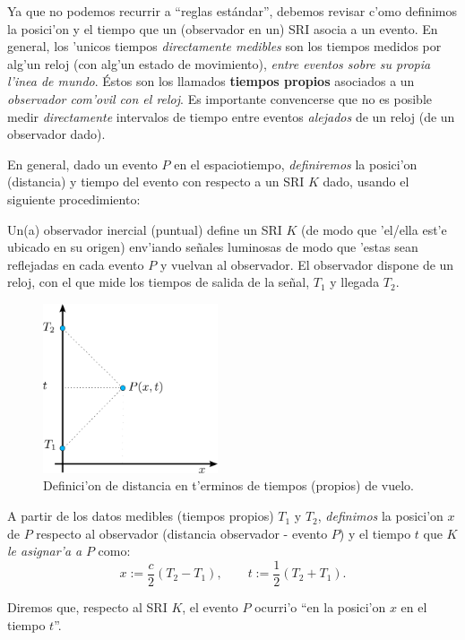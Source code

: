 Ya que no podemos recurrir a ``reglas est\'andar'', debemos revisar c'omo definimos la posici'on y el tiempo que un (observador en un) SRI asocia a un evento. En general, los 'unicos tiempos \textit{directamente medibles} son los tiempos medidos por alg'un reloj (con alg'un estado de movimiento), \textit{entre eventos sobre su propia l'inea de mundo}. Éstos son los llamados \textbf{tiempos propios} asociados a un \textit{observador com'ovil con el reloj}. Es importante convencerse que no es posible medir \textit{directamente} intervalos de tiempo entre eventos \textit{alejados} de un reloj (de un observador dado).

En general, dado un evento $P$ en el espaciotiempo, \textit{definiremos} la posici'on (distancia) y tiempo del evento con respecto a un SRI $K$ dado, usando el siguiente procedimiento:

Un(a) observador inercial (puntual) define un SRI $K$ (de modo que 'el/ella est'e  ubicado en su origen) env'iando se\~nales luminosas de modo que 'estas sean reflejadas en cada evento $P$ y vuelvan al observador. El observador dispone de un reloj,  con el que mide los tiempos de salida de la se\~nal, $T_1$
y llegada $T_2$.
\begin{figure}[!h]
\centerline{\includegraphics[height=5cm]{fig/fig-diagrama-definicion-x-y-t.pdf}}
 \caption{Definici'on de distancia en t'erminos de tiempos (propios) de vuelo.}
\label{defdist}
\end{figure}
A partir de los datos medibles (tiempos propios) $T_1$ y $T_2$, \textit{definimos} la posici'on
$x$ de $P$ respecto al observador (distancia observador - evento $P$) y el
tiempo $t$ que $K$ \textit{le asignar'a a} $P$ como:
\begin{equation}\label{defxt}
\boxed{x:=\frac{c}{2}(T_2-T_1), \qquad t:=\frac{1}{2}(T_2+T_1).}
\end{equation}

Diremos que, respecto al SRI $K$, el evento $P$ ocurri'o ``en la posici'on $x$ en el tiempo $t$''.

